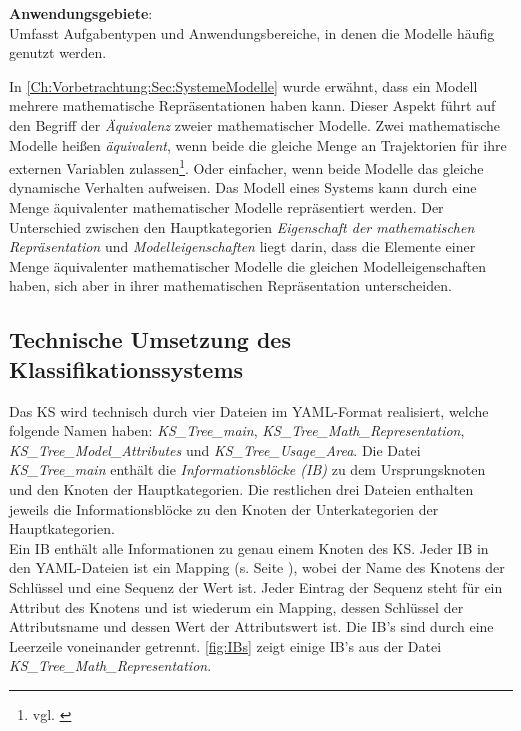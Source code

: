 \textbf{Anwendungsgebiete}: \\
Umfasst Aufgabentypen und Anwendungsbereiche, in denen die Modelle häufig genutzt werden.

In \autoref{Ch:Vorbetrachtung:Sec:SystemeModelle} wurde erwähnt, dass ein Modell mehrere mathematische Repräsentationen haben kann. Dieser Aspekt führt auf den Begriff der \textit{Äquivalenz} zweier mathematischer Modelle. Zwei mathematische Modelle heißen \textit{äquivalent}, wenn beide die gleiche Menge an Trajektorien für ihre externen Variablen zulassen\footnote{vgl. \cite[S. 34]{SCH89}}. Oder einfacher, wenn beide Modelle das gleiche dynamische Verhalten aufweisen. Das Modell eines Systems kann durch eine Menge äquivalenter mathematischer Modelle repräsentiert werden. Der Unterschied zwischen den Hauptkategorien \textit{Eigenschaft der mathematischen Repräsentation} und \textit{Modelleigenschaften} liegt darin, dass die Elemente einer Menge äquivalenter mathematischer Modelle die gleichen Modelleigenschaften haben, sich aber in ihrer mathematischen Repräsentation unterscheiden.

\subsection{Technische Umsetzung des Klassifikationssystems}
\label{Ch:Ergebnisse:Sec:KS:SubSec:TechUmsetzung}
Das KS wird technisch durch vier Dateien im YAML-Format realisiert, welche folgende Namen haben: \textit{KS\_Tree\_main}, \textit{KS\_Tree\_Math\_Representation}, \textit{KS\_Tree\_Model\_Attributes} und \textit{KS\_Tree\_Usage\_Area}. Die Datei \textit{KS\_Tree\_main} enthält die \textit{Informationsblöcke (IB)} zu dem Ursprungsknoten und den Knoten der Hauptkategorien. Die restlichen drei Dateien enthalten jeweils die Informationsblöcke zu den Knoten der Unterkategorien der Hauptkategorien. \\ 
Ein IB enthält alle Informationen zu genau einem Knoten des KS. Jeder IB in den YAML-Dateien ist ein Mapping (s. Seite \pageref{YAML_Erklärung}), wobei der Name des Knotens der Schlüssel und eine Sequenz der Wert ist. Jeder Eintrag der Sequenz steht für ein Attribut des Knotens und ist wiederum ein Mapping, dessen Schlüssel der Attributsname und dessen Wert der Attributswert ist. Die IB\textquoteright s sind durch eine Leerzeile voneinander getrennt. \autoref{fig:IBs} zeigt einige IB\textquoteright s aus der Datei \textit{KS\_Tree\_Math\_Representation}.

